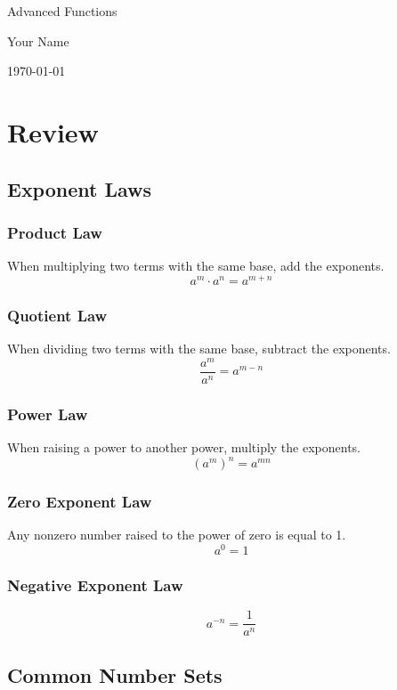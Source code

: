 \documentclass{article}
\begin{document}
\begin{titlepage}
    \centering
    \vspace*{2cm}
    {\LARGE \textcolor{lessoncolor}{Advanced Functions}}\par
    \vspace{1cm}
    {\large Your Name}\par
    \vspace{2cm}
    {\large \today}\par
    \vspace{3cm}
\end{titlepage}
\tableofcontents
\newpage


\section*{Review}
\subsection{Exponent Laws}
 
\subsubsection*{Product Law}
When multiplying two terms with the same base, add the exponents.
\[ a^m \cdot a^n = a^{m + n} \]

\subsubsection*{Quotient Law}
When dividing two terms with the same base, subtract the exponents.
\[ \frac{a^m}{a^n} = a^{m - n} \]

\subsubsection*{Power Law}
When raising a power to another power, multiply the exponents.
\[ (a^m)^n = a^{mn} \]

\subsubsection*{Zero Exponent Law}
Any nonzero number raised to the power of zero is equal to 1.
\[ a^0 = 1 \]

\subsubsection*{Negative Exponent Law}
\[ a^{-n} = \frac{1}{a^n} \]
\newpage
\subsection{Common Number Sets}
\end{document}
